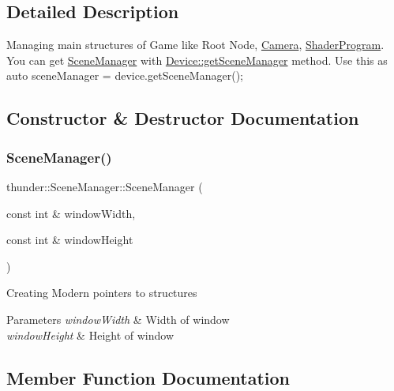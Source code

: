 \subsection{Detailed Description}
Managing main structures of Game like Root Node, \mbox{\hyperlink{classthunder_1_1_camera}{Camera}}, \mbox{\hyperlink{classthunder_1_1_shader_program}{Shader\+Program}}. You can get \mbox{\hyperlink{classthunder_1_1_scene_manager}{Scene\+Manager}} with \mbox{\hyperlink{classthunder_1_1_device_ab71a4d27bde5e833e33cc88b199b7010}{Device\+::get\+Scene\+Manager}} method. Use this as {\ttfamily auto scene\+Manager = device.\+get\+Scene\+Manager();} 

\subsection{Constructor \& Destructor Documentation}
\mbox{\label{classthunder_1_1_scene_manager_a586dde422108d14fe061375e7454c144}} 
\subsubsection{\texorpdfstring{Scene\+Manager()}{SceneManager()}}
{\footnotesize\ttfamily thunder\+::\+Scene\+Manager\+::\+Scene\+Manager (\begin{DoxyParamCaption}\item[{const int \&}]{window\+Width,  }\item[{const int \&}]{window\+Height }\end{DoxyParamCaption})}

Creating Modern pointers to structures


\begin{DoxyParams}{Parameters}
{\em window\+Width} & Width of window \\
\hline
{\em window\+Height} & Height of window \\
\hline
\end{DoxyParams}


\subsection{Member Function Documentation}
\mbox{\label{classthunder_1_1_scene_manager_a9d827a1795893be9092e8e3942fd1fc7}} 
